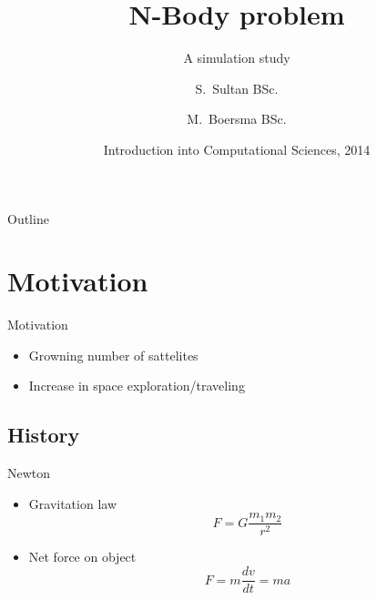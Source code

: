 \documentclass{beamer}
\title[] %
{N-Body problem}
\subtitle
{A simulation study}
\author[S. Sultan, M. Boersma] %
{S.~Sultan\inst{1} BSc. \and M.~Boersma\inst{1} BSc.}
\institute[Universities of Amsterdam] %
{
  \inst{1}%
  Department of Computational Science\\
  University of Amsterdam
 }
\date[CFP 2003] %
{Introduction into Computational Sciences, 2014}
\begin{document}
\begin{frame}
  \titlepage
\end{frame}

\begin{frame}{Outline}
  \tableofcontents
\end{frame}





\section{Motivation}

\begin{frame}{Motivation}
	\begin{itemize}
		\item
			Growning number of sattelites 
		\item
			Increase in space exploration/traveling
	\end{itemize}
\end{frame}


\subsection{History}

\begin{frame}{Newton}
	\begin{itemize}
		\item
			Gravitation law \begin{equation} F = G \frac{m_1m_2}{r^2}\end{equation}
		\item 
			Net force on object \begin{equation} F = m \frac{dv}{dt} = ma \end{equation}
	\end{itemize}
\end{frame}
\end{document}
